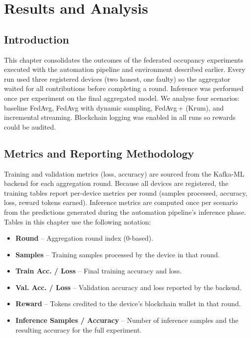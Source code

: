 \chapter{Results and Analysis}
\label{chap:results}

\section{Introduction}

This chapter consolidates the outcomes of the federated occupancy experiments executed with the automation pipeline and environment described earlier. Every run used three registered devices (two honest, one faulty) so the aggregator waited for all contributions before completing a round. Inference was performed once per experiment on the final aggregated model. We analyse four scenarios: baseline FedAvg, FedAvg with dynamic sampling, FedAvg\,+ (Krum), and incremental streaming. Blockchain logging was enabled in all runs so rewards could be audited.

\section{Metrics and Reporting Methodology}

Training and validation metrics (loss, accuracy) are sourced from the Kafka-ML backend for each aggregation round. Because all devices are registered, the training tables report per-device metrics per round (samples processed, accuracy, loss, reward tokens earned). Inference metrics are computed once per scenario from the predictions generated during the automation pipeline’s inference phase. Tables in this chapter use the following notation:

\begin{itemize}
    \item \textbf{Round} – Aggregation round index (0-based).
    \item \textbf{Samples} – Training samples processed by the device in that round.
    \item \textbf{Train Acc. / Loss} – Final training accuracy and loss.
    \item \textbf{Val. Acc. / Loss} – Validation accuracy and loss reported by the backend.
    \item \textbf{Reward} – Tokens credited to the device’s blockchain wallet in that round.
    \item \textbf{Inference Samples / Accuracy} – Number of inference samples and the resulting accuracy for the full experiment.
\end{itemize}

